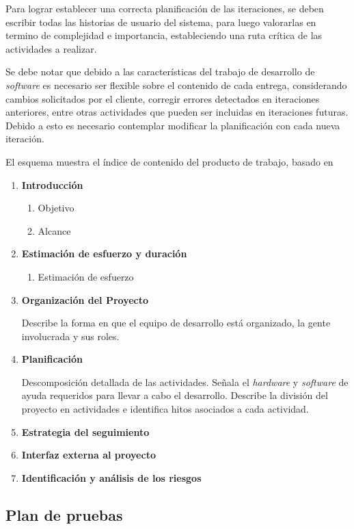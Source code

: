 Para lograr establecer una correcta planificación de las iteraciones, se deben escribir todas las historias de usuario del sistema, para luego valorarlas en termino de complejidad e importancia, estableciendo una ruta crítica de las actividades a realizar. 

Se debe notar que debido a las características del trabajo de desarrollo de \emph{software} es necesario ser flexible sobre el contenido de cada entrega, considerando cambios solicitados por el cliente, corregir errores detectados en iteraciones anteriores, entre otras actividades que pueden ser incluidas en iteraciones futuras. Debido a esto es necesario contemplar modificar la planificación con cada nueva iteración.

El esquema muestra el índice de contenido del producto de trabajo, basado en \citet{mem00}

\begin{framed}
     \begin{enumerate}
		\item \textbf{Introducción}
		\begin{enumerate}
			\item Objetivo
			\item Alcance 
		\end{enumerate}
		\item \textbf{Estimación de esfuerzo y duración}
		\begin{enumerate}
			\item Estimación de esfuerzo
		\end{enumerate}		
		\item \textbf{Organización del Proyecto}

		Describe la forma en que el equipo de desarrollo está organizado, la gente involucrada y sus roles.
		\item \textbf{Planificación}

		Descomposición detallada de las actividades. Señala el \emph{hardware} y \emph{software} de ayuda requeridos para llevar a cabo el desarrollo. Describe la división del proyecto en actividades e identifica hitos asociados a cada actividad.
		\item \textbf{Estrategia del seguimiento}
		\item \textbf{Interfaz externa al proyecto}
		\item \textbf{Identificación y análisis de los riesgos}
	\end{enumerate}
\end{framed}

\subsection{Plan de pruebas}

